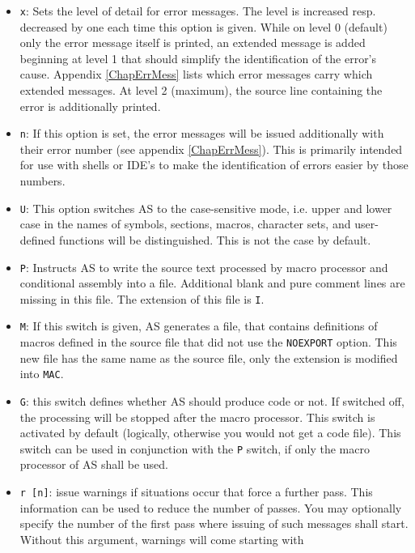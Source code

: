 \documentclass[12pt,twoside]{report}
\newcommand{\tty}[1]{{\tt #1}}
\begin{document}
\begin{itemize}
{      this depends on the sources.}
\item{\tty{x}: Sets the level of detail for error messages.  The level
      is increased resp. decreased by one each time this option is given.
      While on level 0 (default) only the error message itself is printed,
      an extended message is added beginning at level 1 that should
      simplify the identification of the error's cause.  Appendix
      \ref{ChapErrMess} lists which error messages carry which extended
      messages.  At level 2 (maximum), the source line containing the
      error is additionally printed.}
\item{\tty{n}: If this option is set, the error messages will be issued
      additionally with their error number (see appendix
      \ref{ChapErrMess}).  This is primarily intended for use with shells
      or IDE's to make the identification of errors easier by those
      numbers.}
\item{\tty{U}: This option switches AS to the case-sensitive mode, i.e.
      upper and lower case in the names of symbols, sections, macros,
      character sets, and user-defined functions will be distinguished.
      This is not the case by default.}
\item{\tty{P}: Instructs AS to write the source text processed by macro
      processor and conditional assembly into a file.  Additional
      blank and pure comment lines are missing in this file.  The
      extension of this file is \tty{I}.}
\item{\tty{M}: If this switch is given, AS generates a file, that contains
      definitions of macros defined in the source file that did not
      use the \tty{NOEXPORT} option.  This new file has the same name as
      the source file, only the extension is modified into \tty{MAC}.}
\item{\tty{G}: this switch defines whether AS should produce code or not.
      If switched off, the processing will be stopped after the macro
      processor. This switch is activated by default (logically,
      otherwise you would not get a code file). This switch can be
      used in conjunction with the \tty{P} switch, if only the macro
      processor of AS shall be used.}
\item{\tty{r [n]}: issue warnings if situations occur that force a further
      pass. This information can be used to reduce the number of
      passes.  You may optionally specify the number of the
      first pass where issuing of such messages shall start.
      Without this argument, warnings will come starting with
}
\end{itemize}
\end{document}
